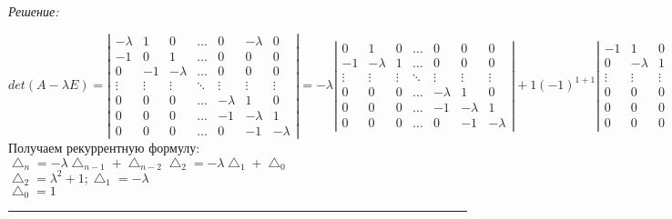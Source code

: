 \documentclass[a4paper, 12pt]{article}
\newenvironment{solution}
    {\textit{Решение: }}
    {\noindent\rule{7in}{1.5pt}}
\begin{document}
\begin{solution}

$\displaystyle
det(A-\lambda E)
=
\left| \begin{array}{rrrrrrr}-\lambda & 1 & 0 & \ldots & 0 & -\lambda & 0\\ -1 & 0 & 1 & \ldots & 0 & 0 & 0 \\ 0 & -1 & -\lambda & \ldots & 0 & 0 & 0 \\ \vdots & \vdots & \vdots & \ddots & \vdots & \vdots & \vdots \\ 0 & 0 & 0 & \ldots & -\lambda & 1 & 0 \\ 0 & 0 & 0 & \ldots & -1 & -\lambda & 1 \\ 0 & 0 & 0 & \ldots & 0 & -1 & -\lambda \end{array} \right|
=
-\lambda\left| \begin{array}{rrrrrrr} 0 & 1 & 0 & \ldots & 0 & 0 & 0 \\ -1 & -\lambda & 1 & \ldots & 0 & 0 & 0 \\ \vdots & \vdots & \vdots & \ddots & \vdots & \vdots & \vdots \\ 0 & 0 & 0 & \ldots & -\lambda & 1 & 0 \\ 0 & 0 & 0 & \ldots & -1 & -\lambda & 1 \\ 0 & 0 & 0 & \ldots & 0 & -1 & -\lambda \end{array} \right|
+
1(-1)^{1+1}\left| \begin{array}{rrrrrrr}-1 & 1 & 0 & \ldots & 0 & 0 & 0 \\ 0 & -\lambda & 1 & \ldots & 0 & 0 & 0 \\ \vdots & \vdots & \vdots & \ddots & \vdots & \vdots & \vdots \\ 0 & 0 & 0 & \ldots & -\lambda & 1 & 0 \\ 0 & 0 & 0 & \ldots & -1 & -\lambda & 1 \\ 0 & 0 & 0 & \ldots & 0 & -1 & -\lambda \end{array} \right|
=-\lambda\bigtriangleup_{n-1}+\bigtriangleup_{n-2}
$
\\
Получаем рекуррентную формулу: $\displaystyle
\bigtriangleup_{n}=-\lambda\bigtriangleup_{n-1}+\bigtriangleup_{n-2}
\bigtriangleup_2=-\lambda\bigtriangleup_1+\bigtriangleup_0
$
\\
$\displaystyle
\bigtriangleup_2=\lambda^2+1;\bigtriangleup_1=-\lambda$
\\
$\displaystyle
\bigtriangleup_0=1$
\\

\end{solution}
\end{document}
